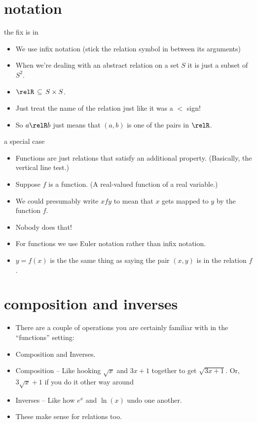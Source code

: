\documentclass[handout,landscape]{beamer}
\begin{document}
\section{notation}

\begin{frame}{the fix is in}
\begin{itemize}
\item We use infix notation (stick the relation symbol in between its arguments) \pause
\item When we're dealing with an abstract relation on a set $S$ it is just a subset of $S^2$. \pause
\item $\displaystyle  \relR \, \subseteq \, S \times S$. \pause
\item Just treat the name of the relation just like it was a $<$ sign! \pause
\item So $a \relR b$ just means that $(a,b)$ is one of the pairs in $\relR$.
\end{itemize}
\end{frame}

\begin{frame}{a special case}
\begin{itemize}
\item Functions are just relations that satisfy an additional property. \pause \newline
(Basically, the vertical line test.) \pause
\item Suppose $f$ is a function. \pause
(A real-valued function of a real variable.) \pause
\item We could presumably write $xfy$ to mean that $x$ gets mapped to $y$ by the function $f$. \pause
\item Nobody does that! \pause
\item For functions we use Euler notation rather than infix notation. \pause
\item $y = f(x)$ is the the same thing as saying the pair $(x,y)$ is in the relation $f$.

\end{itemize}
\end{frame}


\section{composition and inverses}

\begin{frame}{}
\begin{itemize}
\item There are a couple of operations you are certainly familiar with in the ``functions'' setting:\pause
\item Composition and Inverses. \pause
\item Composition -- Like hooking $\sqrt{x}$ and $3x+1$ together to get $\sqrt{3x+1}$. \pause \newline
Or, $3\sqrt{x}+1$ if you do it other way around\textellipsis \pause 
\item Inverses -- Like how $e^x$ and $\ln{(x)}$ undo one another. \pause
\item These make sense for relations too.
\end{itemize}
\end{frame}
\end{document}
